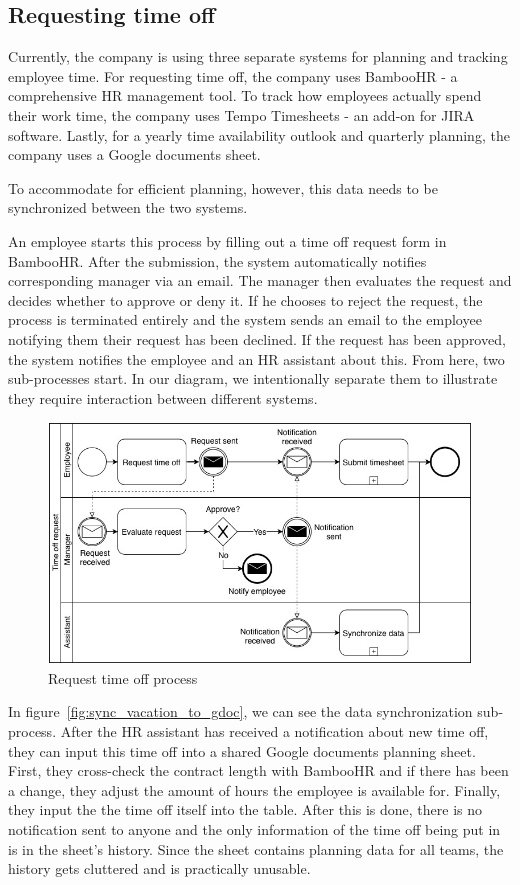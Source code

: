 \documentclass[12pt,oneside]{fithesis2}
\begin{document}
\subsection{Requesting time off}
Currently, the company is using three separate systems for planning and tracking employee time. For requesting time off, the company uses BambooHR - a comprehensive HR management tool. To track how employees actually spend their work time, the company uses Tempo Timesheets - an add-on for JIRA software. Lastly, for a yearly time availability outlook and quarterly planning, the company uses a Google documents sheet.

To accommodate for efficient planning, however, this data needs to be synchronized between the two systems.

An employee starts this process by filling out a time off request form in BambooHR. After the submission, the system automatically notifies corresponding manager via an email. The manager then evaluates the request and decides whether to approve or deny it. If he chooses to reject the request, the process is terminated entirely and the system sends an email to the employee notifying them their request has been declined. If the request has been approved, the system notifies the employee and an HR assistant about this. From here, two sub-processes start. In our diagram, we intentionally separate them to illustrate they require interaction between different systems.

\begin{figure}[H]
    \centering
    \includegraphics[width=\textwidth]{images/time_off_request.jpg}
    \caption{Request time off process}
    \label{fig:time_off_request}
\end{figure}

In figure~\ref{fig:sync_vacation_to_gdoc}, we can see the data synchronization sub-process. After the HR assistant has received a notification about new time off, they can input this time off into a shared Google documents planning sheet. First, they cross-check the contract length with BambooHR and if there has been a change, they adjust the amount of hours the employee is available for. Finally, they input the the time off itself into the table. After this is done, there is no notification sent to anyone and the only information of the time off being put in is in the sheet's history. Since the sheet contains planning data for all teams, the history gets cluttered and is practically unusable.
\end{document}
